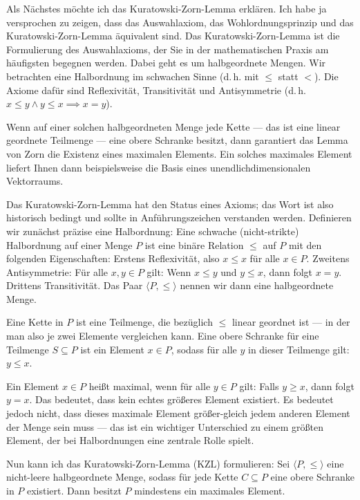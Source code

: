 \begin{spoken-clean}[01:12:36 - 01:14:54]
Als Nächstes möchte ich das Kuratowski-Zorn-Lemma erklären. Ich habe ja versprochen zu zeigen, dass das Auswahlaxiom, das Wohlordnungsprinzip und das Kuratowski-Zorn-Lemma äquivalent sind. Das Kuratowski-Zorn-Lemma ist die Formulierung des Auswahlaxioms, der Sie in der mathematischen Praxis am häufigsten begegnen werden. Dabei geht es um halbgeordnete Mengen. Wir betrachten eine Halbordnung im schwachen Sinne (d.\,h. mit $\le$ statt $<$). Die Axiome dafür sind Reflexivität, Transitivität und Antisymmetrie (d.\,h. $x \le y \land y \le x \implies x = y$).

Wenn auf einer solchen halbgeordneten Menge jede Kette --- das ist eine linear geordnete Teilmenge --- eine obere Schranke besitzt, dann garantiert das Lemma von Zorn die Existenz eines maximalen Elements. Ein solches maximales Element liefert Ihnen dann beispielsweise die Basis eines unendlichdimensionalen Vektorraums.

Das Kuratowski-Zorn-Lemma hat den Status eines Axioms; das Wort  ist also historisch bedingt und sollte in Anführungszeichen verstanden werden. Definieren wir zunächst präzise eine Halbordnung: Eine schwache (nicht-strikte) Halbordnung auf einer Menge $P$ ist eine binäre Relation $\le$ auf $P$ mit den folgenden Eigenschaften: Erstens Reflexivität, also $x \le x$ für alle $x \in P$. Zweitens Antisymmetrie: Für alle $x, y \in P$ gilt: Wenn $x \le y$ und $y \le x$, dann folgt $x = y$. Drittens Transitivität. Das Paar $\langle P, \le \rangle$ nennen wir dann eine halbgeordnete Menge.

Eine Kette in $P$ ist eine Teilmenge, die bezüglich $\le$ linear geordnet ist --- in der man also je zwei Elemente vergleichen kann. Eine obere Schranke für eine Teilmenge $S \subseteq P$ ist ein Element $x \in P$, sodass für alle $y$ in dieser Teilmenge gilt: $y \le x$.

Ein Element $x \in P$ heißt maximal, wenn für alle $y \in P$ gilt: Falls $y \ge x$, dann folgt $y = x$. Das bedeutet, dass kein echtes größeres Element existiert. Es bedeutet jedoch nicht, dass dieses maximale Element größer-gleich jedem anderen Element der Menge sein muss --- das ist ein wichtiger Unterschied zu einem größten Element, der bei Halbordnungen eine zentrale Rolle spielt.

Nun kann ich das Kuratowski-Zorn-Lemma ($\text{KZL}$) formulieren: Sei $\langle P, \le \rangle$ eine nicht-leere halbgeordnete Menge, sodass für jede Kette $C \subseteq P$ eine obere Schranke in $P$ existiert. Dann besitzt $P$ mindestens ein maximales Element.
\end{spoken-clean}

